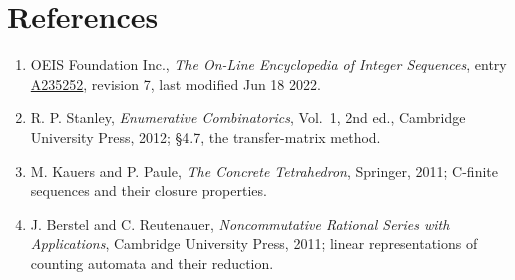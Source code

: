 \documentclass[11pt]{article}
\theoremstyle{definition}
\begin{document}
\section{References}

\begin{enumerate}

\item OEIS Foundation Inc., \emph{The On-Line Encyclopedia of Integer Sequences}, entry \href{https://oeis.org/A235252}{A235252}, revision 7, last modified Jun 18 2022.

\item R. P. Stanley, \emph{Enumerative Combinatorics}, Vol.~1, 2nd ed., Cambridge University Press, 2012; \S4.7, the transfer-matrix method.

\item M. Kauers and P. Paule, \emph{The Concrete Tetrahedron}, Springer, 2011; C-finite sequences and their closure properties.

\item J. Berstel and C. Reutenauer, \emph{Noncommutative Rational Series with Applications}, Cambridge University Press, 2011; linear representations of counting automata and their reduction.

\end{enumerate}
\end{document}
